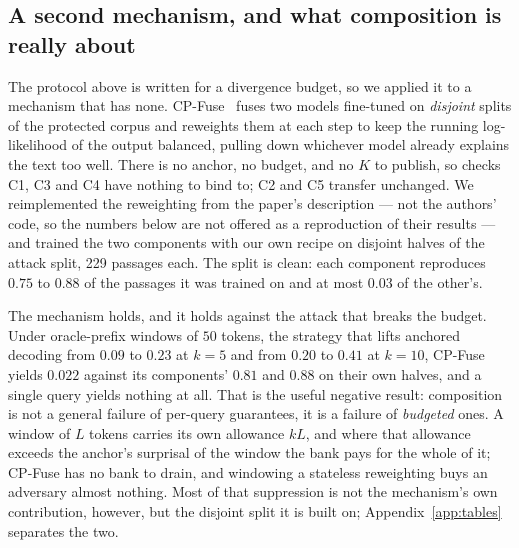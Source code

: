 \subsection{A second mechanism, and what composition is really about}\label{sec:cpfuse}
The protocol above is written for a divergence budget, so we applied it to a mechanism that has none. CP-Fuse~\cite{abad2025cpfuse} fuses two models fine-tuned on \emph{disjoint} splits of the protected corpus and reweights them at each step to keep the running log-likelihood of the output balanced, pulling down whichever model already explains the text too well. There is no anchor, no budget, and no $K$ to publish, so checks C1, C3 and C4 have nothing to bind to; C2 and C5 transfer unchanged. We reimplemented the reweighting from the paper's description --- not the authors' code, so the numbers below are not offered as a reproduction of their results --- and trained the two components with our own recipe on disjoint halves of the attack split, 229 passages each. The split is clean: each component reproduces $0.75$ to $0.88$ of the passages it was trained on and at most $0.03$ of the other's.

The mechanism holds, and it holds against the attack that breaks the budget. Under oracle-prefix windows of $50$ tokens, the strategy that lifts anchored decoding from $0.09$ to $0.23$ at $k=5$ and from $0.20$ to $0.41$ at $k=10$, CP-Fuse yields $0.022$ against its components' $0.81$ and $0.88$ on their own halves, and a single query yields nothing at all. That is the useful negative result: composition is not a general failure of per-query guarantees, it is a failure of \emph{budgeted} ones. A window of $L$ tokens carries its own allowance $kL$, and where that allowance exceeds the anchor's surprisal of the window the bank pays for the whole of it; CP-Fuse has no bank to drain, and windowing a stateless reweighting buys an adversary almost nothing. Most of that suppression is not the mechanism's own contribution, however, but the disjoint split it is built on; Appendix~\ref{app:tables} separates the two.
